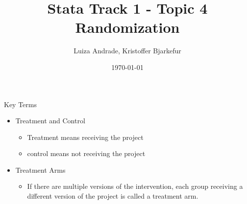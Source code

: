 \documentclass[aspectratio=169]{beamer}
\title{Stata Track 1 - Topic 4 \newline Randomization}
\date{\today}
\author{Luiza Andrade, Kristoffer Bjarkefur} %
\institute{Development Impact Evaluation (DIME) \newline The World Bank }
\begin{document}
	{
		\maketitle
	}

\begin{frame}{Key Terms}
	\begin{itemize}
		\item Treatment and Control
		\begin{itemize}
			\item Treatment means receiving the project
			\item control means not receiving the project
		\end{itemize}
		\item Treatment Arms
		\begin{itemize}
			\item If there are multiple versions of the intervention, each group receiving a different version of the project is called a treatment arm.
		\end{itemize}
	\end{itemize}
\end{frame}
\end{document}
